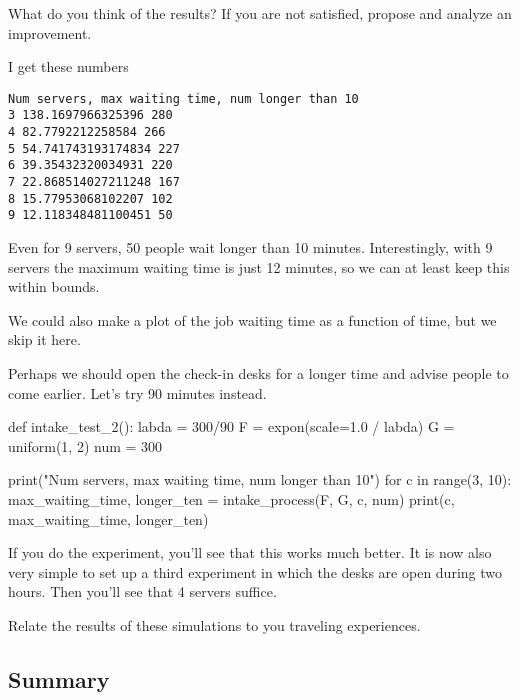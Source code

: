 \begin{exercise}
  What do you think of the results? If you are not satisfied, propose and analyze an improvement.

  \begin{solution}
    I get these numbers

\begin{verbatim}
Num servers, max waiting time, num longer than 10
3 138.1697966325396 280
4 82.7792212258584 266
5 54.741743193174834 227
6 39.35432320034931 220
7 22.868514027211248 167
8 15.77953068102207 102
9 12.118348481100451 50
\end{verbatim}
    
    Even for 9 servers, 50 people wait longer than 10 minutes. Interestingly, with 9 servers the maximum waiting time is just 12 minutes, so we can at least keep this within bounds.

We could also make a plot of the job waiting time as a function of time, but we skip it here. 


Perhaps we should open the check-in desks for a longer time and advise people to come earlier. Let's try 90 minutes instead.

\begin{pyverbatim}

def intake_test_2():
    labda = 300/90
    F = expon(scale=1.0 / labda)
    G = uniform(1, 2)
    num = 300

    print("Num servers, max waiting time, num longer than 10")
    for c in range(3, 10):
        max_waiting_time, longer_ten = intake_process(F, G, c, num)
        print(c, max_waiting_time, longer_ten)

  
\end{pyverbatim}

If you do the experiment, you'll see that this works much better. It is now also very simple to set up a third experiment in which the desks are open during two hours. Then you'll see that 4 servers  suffice. 

  \end{solution}

\end{exercise}

\begin{exercise}
  Relate the results of these simulations to you traveling experiences. 
\end{exercise}


\subsection{Summary}
\label{sec:summary}


